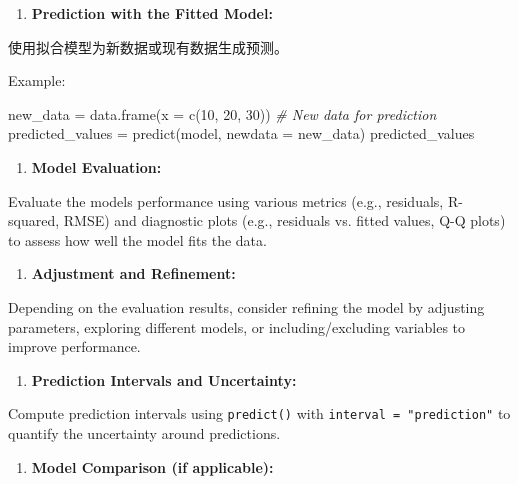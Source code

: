 \documentclass[
]{article}
\newenvironment{Shaded}{}{}
\newcommand{\AttributeTok}[1]{\textcolor[rgb]{0.49,0.56,0.16}{#1}}
\newcommand{\CommentTok}[1]{\textcolor[rgb]{0.38,0.63,0.69}{\textit{#1}}}
\newcommand{\DecValTok}[1]{\textcolor[rgb]{0.25,0.63,0.44}{#1}}
\newcommand{\FunctionTok}[1]{\textcolor[rgb]{0.02,0.16,0.49}{#1}}
\newcommand{\NormalTok}[1]{#1}
\newcommand{\OtherTok}[1]{\textcolor[rgb]{0.00,0.44,0.13}{#1}}
\begin{document}
\begin{enumerate}
\def\labelenumi{\arabic{enumi}.}
\item
  \textbf{Prediction with the Fitted Model:}
\end{enumerate}

使用拟合模型为新数据或现有数据生成预测。

Example:

\begin{Shaded}
\begin{Highlighting}[]
\NormalTok{new\_data }\OtherTok{=} \FunctionTok{data.frame}\NormalTok{(}\AttributeTok{x =} \FunctionTok{c}\NormalTok{(}\DecValTok{10}\NormalTok{, }\DecValTok{20}\NormalTok{, }\DecValTok{30}\NormalTok{))  }\CommentTok{\# New data for prediction}
\NormalTok{predicted\_values }\OtherTok{=} \FunctionTok{predict}\NormalTok{(model, }\AttributeTok{newdata =}\NormalTok{ new\_data)}
\NormalTok{predicted\_values}
\end{Highlighting}
\end{Shaded}

\begin{enumerate}
\def\labelenumi{\arabic{enumi}.}
\item
  \textbf{Model Evaluation:}
\end{enumerate}

Evaluate the model\textquotesingle s performance using various metrics
(e.g., residuals, R-squared, RMSE) and diagnostic plots (e.g., residuals
vs. fitted values, Q-Q plots) to assess how well the model fits the
data.

\begin{enumerate}
\def\labelenumi{\arabic{enumi}.}
\item
  \textbf{Adjustment and Refinement:}
\end{enumerate}

Depending on the evaluation results, consider refining the model by
adjusting parameters, exploring different models, or including/excluding
variables to improve performance.

\begin{enumerate}
\def\labelenumi{\arabic{enumi}.}
\item
  \textbf{Prediction Intervals and Uncertainty:}
\end{enumerate}

Compute prediction intervals using \texttt{predict()} with
\texttt{interval\ =\ "prediction"} to quantify the uncertainty around
predictions.

\begin{enumerate}
\def\labelenumi{\arabic{enumi}.}
\item
  \textbf{Model Comparison (if applicable):}
\end{enumerate}
\end{document}
